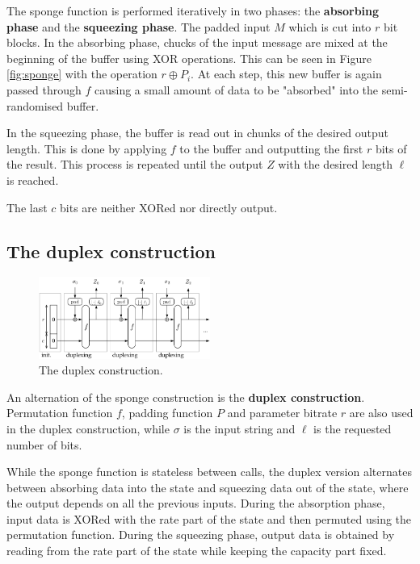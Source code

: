The sponge function is performed iteratively in two phases: the \textbf{absorbing phase} and the \textbf{squeezing phase}. The padded input $M$ which is cut into $r$ bit blocks. In the absorbing phase, chucks of the input message are mixed at the beginning of the buffer using XOR operations. This can be seen in Figure \ref{fig:sponge} with the operation $r \oplus P_i$. At each step, this new buffer is again passed through $f$ causing a small amount of data to be "absorbed" into the semi-randomised buffer. \cite{keccak_team, sponge_function_2023,DBLP:journals/joc/DobraunigEMS21} \par 

In the squeezing phase, the buffer is read out in chunks of the desired output length. This is done by applying $f$ to the buffer and outputting the first $r$ bits of the result. This process is repeated until the output $Z$ with the desired length $\ell$ is reached. \cite{keccak_team,sponge_function_2023,DBLP:journals/joc/DobraunigEMS21} \par 

The last $c$ bits are neither XORed nor directly output. \par 

\subsection{The duplex construction}

\begin{figure}[htbp]
  \centering
  \includegraphics[width=0.5\textwidth]{images/Duplex-150.png}
  \caption{The duplex construction.}
  \label{fig:duplex}
\end{figure}

An alternation of the sponge construction is the \textbf{duplex construction}. Permutation function $f$, padding function $P$ and parameter bitrate $r$ are also used in the duplex construction, while $\sigma$ is the input string and $\ell$ is the requested number of bits. \cite{keccak_team,sponge_function_2023,guido_b_d_michaël_p_2011} \par 

While the sponge function is stateless between calls, the duplex version alternates between absorbing data into the state and squeezing data out of the state, where the output depends on all the previous inputs. \cite{guido_b_d_michaël_p_2011,cryptoeprint:2023/796} During the absorption phase, input data is XORed with the rate part of the state and then permuted using the permutation function. During the squeezing phase, output data is obtained by reading from the rate part of the state while keeping the capacity part fixed. \par

